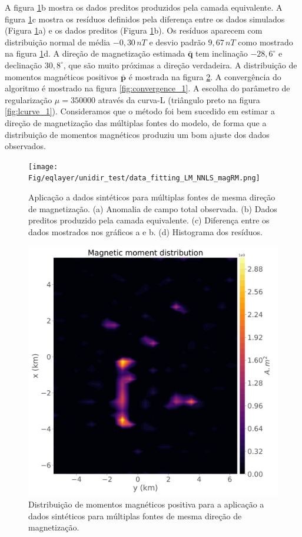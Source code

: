 A figura \ref{fig:data_fitting_1}b mostra os dados preditos produzidos pela camada equivalente. A figura \ref{fig:data_fitting_1}c mostra os resíduos definidos pela diferença entre os dados simulados (Figura \ref{fig:data_fitting_1}a) e os dados preditos (Figura \ref{fig:data_fitting_1}b). Os resíduos aparecem com distribuição normal de média $-0,30 \, nT$ e desvio padrão $9,67 \, nT$ como mostrado na figura \ref{fig:data_fitting_1}d. A direção de magnetização estimada $\bar{\mathbf{q}}$ tem inclinação $-28,6^\circ$ e declinação $30,8^\circ$, que são muito próximas a direção verdadeira. A distribuição de momentos magnéticos positivos $\bar{\mathbf{p}}$ é mostrada na figura \ref{fig:dist_momentos_pos_1}. A convergência do algoritmo é mostrado na figura \ref{fig:convergence_1}. A escolha do parâmetro de regularização $\mu = 350000$ através da curva-L (triângulo preto na figura \ref{fig:lcurve_1}). Consideramos que o método foi bem sucedido em estimar a direção de magnetização das múltiplas fontes do modelo, de forma que a distribuição de momentos magnéticos produziu um bom ajuste dos dados observados. 

\begin{figure}
	\centering
	\texttt{[image: Fig/eqlayer/unidir\_test/data\_fitting\_LM\_NNLS\_magRM.png]}
	\caption{Aplicação a dados sintéticos para múltiplas fontes de mesma direção de magnetização. (a) Anomalia de campo total observada. (b) Dados preditos produzido pela camada equivalente. (c) Diferença entre os dados mostrados nos gráficos a e b. (d) Histograma dos resíduos.}
	\label{fig:data_fitting_1}
\end{figure}

\begin{figure}
	\centering
	\includegraphics[width=.9\textwidth]{Fig/eqlayer/unidir_test/magnetic_moment_positive_LM_NNLS_magRM.png}
	\caption{Distribuição de momentos magnéticos positiva para a aplicação a dados sintéticos para múltiplas fontes de mesma direção de magnetização.}
	\label{fig:dist_momentos_pos_1}
\end{figure}

